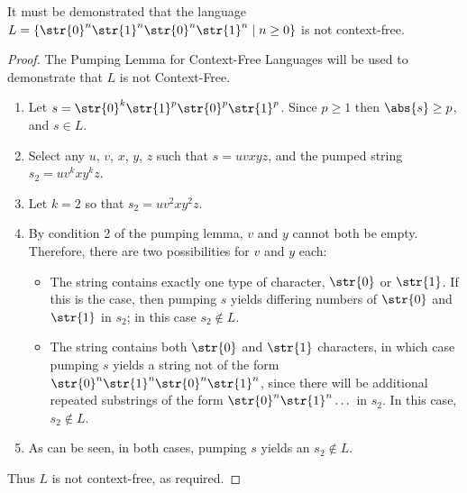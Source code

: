 It must be demonstrated that the language $L = \{ \str{0}^n\str{1}^n\str{0}^n\str{1}^n \mid n \geq 0 \}$ is not context-free.
\begin{proof}
	The Pumping Lemma for Context-Free Languages will be used to demonstrate that $L$ is not Context-Free.
	\begin{enumerate}[label=\Roman*.]
		\item Let $s = \str{0}^k\str{1}^p\str{0}^p\str{1}^p$. Since $p \geq 1$ then $\abs{s} \geq p$, and $s \in L$.
		\item Select any $u$, $v$, $x$, $y$, $z$ such that $s = uvxyz$, and the pumped string $s_2 = uv^kxy^kz$.
		\item Let $k=2$ so that $s_2 = uv^2xy^2z$.
		\item By condition 2 of the pumping lemma, $v$ and $y$ cannot both be empty. Therefore, there are two possibilities for $v$ and $y$ each:
		\begin{itemize}
			\item The string contains exactly one type of character, $\str{0}$ or $\str{1}$. If this is the case, then pumping $s$ yields differing numbers of $\str{0}$ and $\str{1}$ in $s_2$; in this case $s_2 \notin L$.
			\item The string contains both $\str{0}$ and $\str{1}$ characters, in which case pumping $s$ yields a string not of the form $\str{0}^n\str{1}^n\str{0}^n\str{1}^n$, since there will be additional repeated substrings of the form $\str{0}^n\str{1}^n\dots$ in $s_2$. In this case, $s_2 \notin L$.
		\end{itemize}
		\item As can be seen, in both cases, pumping $s$ yields an $s_2 \notin L$.
	\end{enumerate}
	Thus $L$ is not context-free, as required.
\end{proof}